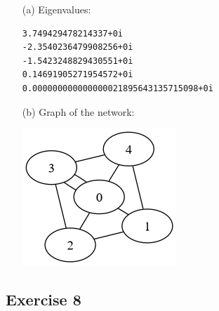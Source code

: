 \documentclass{article}
\begin{document}
\begin{enumerate}
  \item[(a)]
  Eigenvalues:
  \begin{verbatim}
3.749429478214337+0i
-2.3540236479908256+0i
-1.5423248829430551+0i
0.14691905271954572+0i
0.000000000000000021895643135715098+0i
  \end{verbatim}

  \item[(b)]
  Graph of the network:

  \includegraphics{ex7.png}
\end{enumerate}

\newpage

\subsection*{Exercise 8}
\end{document}
